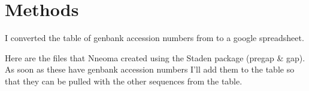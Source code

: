 \documentclass[11pt,]{article}
\begin{document}
\section{Methods}\label{methods}

I converted the table of genbank accession numbers from
\citep{gonzalez_phylogenetic_2016} to a google spreadsheet.

Here are the files that Nneoma created using the Staden package (pregap
\& gap). As soon as these have genbank accession numbers I'll add them
to the table so that they can be pulled with the other sequences from
the table.

\newpage
\singlespacing 
\renewcommand\refname{Results and Discussion}

\end{document}
